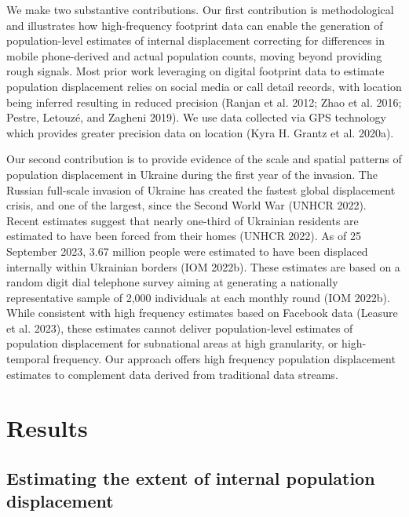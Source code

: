 \documentclass[
  sn-nature,
  11pt,
]{sn-jnl}
\begin{document}
We make two substantive contributions. Our first contribution is
methodological and illustrates how high-frequency footprint data can
enable the generation of population-level estimates of internal
displacement correcting for differences in mobile phone-derived and
actual population counts, moving beyond providing rough signals. Most
prior work leveraging on digital footprint data to estimate population
displacement relies on social media or call detail records, with
location being inferred resulting in reduced precision (Ranjan et al.
2012; Zhao et al. 2016; Pestre, Letouzé, and Zagheni 2019). We use data
collected via GPS technology which provides greater precision data on
location (Kyra H. Grantz et al. 2020a).

Our second contribution is to provide evidence of the scale and spatial
patterns of population displacement in Ukraine during the first year of
the invasion. The Russian full-scale invasion of Ukraine has created the
fastest global displacement crisis, and one of the largest, since the
Second World War (UNHCR 2022). Recent estimates suggest that nearly
one-third of Ukrainian residents are estimated to have been forced from
their homes (UNHCR 2022). As of 25 September 2023, 3.67 million people
were estimated to have been displaced internally within Ukrainian
borders (IOM 2022b). These estimates are based on a random digit dial
telephone survey aiming at generating a nationally representative sample
of 2,000 individuals at each monthly round (IOM 2022b). While consistent
with high frequency estimates based on Facebook data (Leasure et al.
2023), these estimates cannot deliver population-level estimates of
population displacement for subnational areas at high granularity, or
high-temporal frequency. Our approach offers high frequency population
displacement estimates to complement data derived from traditional data
streams.

\section{Results}\label{results}

\subsection{Estimating the extent of internal population
displacement}\label{estimating-the-extent-of-internal-population-displacement}
\end{document}
